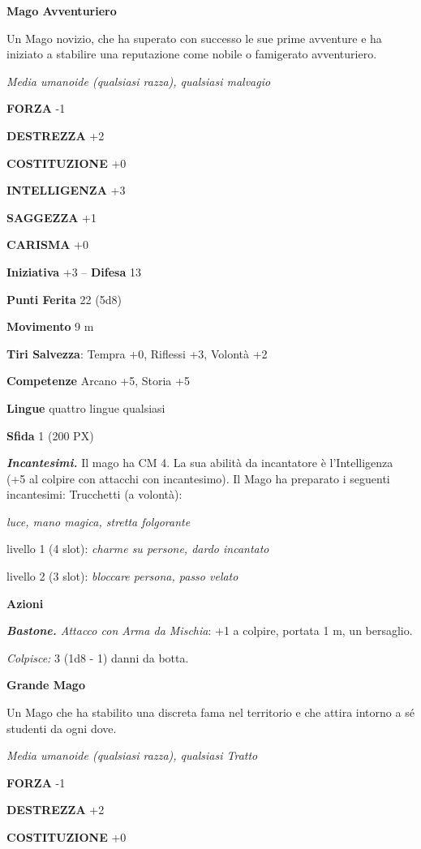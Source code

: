 \begin{multicols}{2}
\medskip\textbf{Mago Avventuriero}

Un Mago novizio, che ha superato con successo le sue prime avventure e ha iniziato a stabilire una reputazione come nobile o famigerato avventuriero.

\textit{Media umanoide (qualsiasi razza), qualsiasi malvagio}

\textbf{FORZA} -1

\textbf{DESTREZZA} +2

\textbf{COSTITUZIONE} +0

\textbf{INTELLIGENZA} +3

\textbf{SAGGEZZA} +1

\textbf{CARISMA} +0

\textbf{Iniziativa} +3 -- \textbf{Difesa} 13

\textbf{Punti Ferita} 22 (5d8)

\textbf{Movimento} 9 m

\textbf{Tiri Salvezza}: Tempra +0, Riflessi +3, Volontà +2

\textbf{Competenze} Arcano +5, Storia +5

\textbf{Lingue} quattro lingue qualsiasi

\textbf{Sfida} 1 (200 PX)

\textit{\textbf{Incantesimi.}} Il mago ha CM 4. La sua abilità da incantatore è l'Intelligenza (+5 al colpire con attacchi con incantesimo). Il Mago ha preparato i seguenti incantesimi: Trucchetti (a volontà):

\textit{luce, mano magica, stretta folgorante}

livello 1 (4 slot): \textit{charme su persone, dardo incantato}

livello 2 (3 slot): \textit{bloccare persona, passo velato}

\textbf{Azioni}

\textit{\textbf{Bastone.} Attacco con Arma da Mischia}: +1 a colpire, portata 1 m, un bersaglio.

\textit{Colpisce:} 3 (1d8 - 1) danni da botta.

\medskip\textbf{Grande Mago}

Un Mago che ha stabilito una discreta fama nel territorio e che attira intorno a sé studenti da ogni dove.

\textit{Media umanoide (qualsiasi razza), qualsiasi Tratto}

\textbf{FORZA} -1

\textbf{DESTREZZA} +2

\textbf{COSTITUZIONE} +0


\end{multicols}
